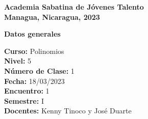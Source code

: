 
\begin{center}

    \textbf
    {
        \Large Academia Sabatina de Jóvenes Talento \\
        \large Managua, Nicaragua, 2023
    }

\end{center}

{\large \textbf{Datos generales}}

\begin{multicols}{2}
{\normalsize
\textbf{Curso:} Polinomios\\
\textbf{Nivel:} 5\\
\textbf{Número de Clase:} 1\\
\textbf{Fecha:} 18/03/2023\\
\textbf{Encuentro:} 1\\
\textbf{Semestre:} I\\
\textbf{Docentes:} Kenny Tinoco y José Duarte
}\end{multicols}